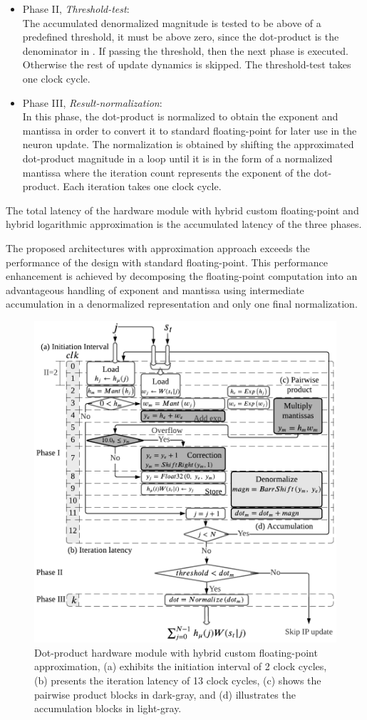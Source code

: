 \begin{itemize}
 	\item{Phase II, \emph{Threshold-test}}: \\
	The accumulated denormalized magnitude is tested to be above of a predefined threshold, it must be above zero, since the dot-product is the denominator in .
 	If passing the threshold, then the next phase is executed. Otherwise the rest of update dynamics is skipped. The threshold-test takes one clock cycle.
 	\item{Phase III, \emph{Result-normalization}}: \\
 	In this phase, the dot-product is normalized to obtain the exponent and mantissa in order to convert it to standard floating-point for later use in the neuron update. The normalization is obtained by shifting the approximated dot-product magnitude in a loop until it is in the form of a normalized mantissa where the iteration count represents the exponent of the dot-product. Each iteration takes one clock cycle.
 	
 \end{itemize}

The total latency of the hardware module with hybrid custom floating-point and hybrid logarithmic approximation is the accumulated latency of the three phases.

The proposed architectures with approximation approach exceeds the performance of the design with standard floating-point. This performance enhancement is achieved by decomposing the floating-point computation into an advantageous handling of exponent and mantissa using intermediate accumulation in a denormalized representation and only one final normalization.

\begin{figure}[h!]
	\centering
	\includegraphics[width=0.5\columnwidth]{./chapters/sbs_accelerator/figures/dot_product.pdf}
	\caption{Dot-product hardware module with hybrid custom floating-point approximation, (a) exhibits the initiation interval of 2 clock cycles, (b) presents the iteration latency of 13 clock cycles, (c) shows the pairwise product blocks in dark-gray, and (d) illustrates the accumulation blocks in light-gray.}
	\label{fig:dot_product_custom}
\end{figure}


